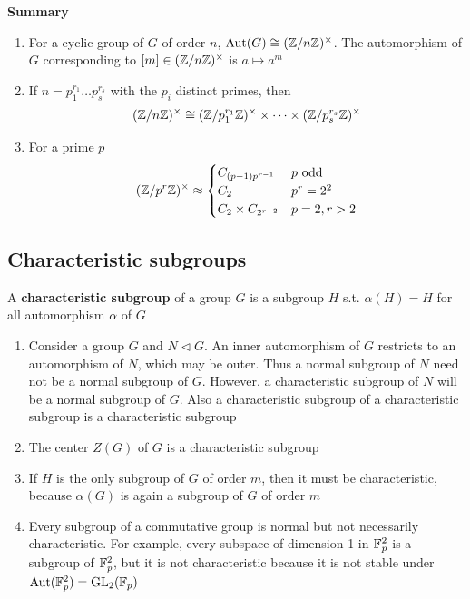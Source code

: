 \documentclass[11pt]{article}
\begin{document}
\textbf{Summary}
\begin{enumerate}
\item For a cyclic group of \(G\) of order \(n\), \(\operatorname{\text{Aut}}(G)\cong(\mathbb{Z}/n\mathbb{Z})^\times\). The automorphism of \(G\)
corresponding to \([m]\in(\mathbb{Z}/n\mathbb{Z})^{\times}\) is \(a\mapsto a^m\)
\item If \(n=p_1^{r_1}\dots p_s^{r_s}\) with the \(p_i\) distinct primes, then
\begin{equation*}
(\mathbb{Z}/n\mathbb{Z})^\times\cong(\mathbb{Z}/p_1^{r_1}\mathbb{Z})^\times \times\dots\times(\mathbb{Z}/p_s^{r_s}\mathbb{Z})^\times
\end{equation*}
\item For a prime \(p\)
\begin{equation*}
(\mathbb{Z}/p^r\mathbb{Z})^\times\approx
\begin{cases}
C_{(p-1)p^{r-1}}&p\text{ odd}\\
C_2&p^r=2^2\\
C_2\times C_{2^{r-2}}&p=2,r>2
\end{cases}
\end{equation*}
\end{enumerate}
\subsection{Characteristic subgroups}
\label{sec:org95d0d3a}
\begin{definition}[]
A \textbf{characteristic subgroup} of a group \(G\) is a subgroup \(H\) s.t. \(\alpha(H)=H\) for all
automorphism \(\alpha\) of \(G\)
\end{definition}

\begin{remark}
\begin{enumerate}
\item Consider a group \(G\) and \(N\lhd G\). An inner automorphism of \(G\) restricts to an
automorphism of \(N\), which may be outer. Thus a normal subgroup of \(N\) need not be a
normal subgroup of \(G\). However, a characteristic subgroup of \(N\) will be a normal
subgroup of \(G\). Also a characteristic subgroup of a characteristic subgroup is a
characteristic subgroup
\item The center \(Z(G)\) of \(G\) is a characteristic subgroup
\item If \(H\) is the only subgroup of \(G\) of order \(m\), then it must be characteristic,
because \(\alpha(G)\) is again a subgroup of \(G\) of order \(m\)
\item Every subgroup of a commutative group is normal but not necessarily characteristic. For
example, every subspace of dimension 1 in \(\mathbb{F}_p^2\) is a subgroup of \(\mathbb{F}_p^2\), but it is not
characteristic because it is not stable under \(\operatorname{\text{Aut}}(\mathbb{F}_p^2)=\operatorname{GL}_2(\mathbb{F}_p)\)
\end{enumerate}
\end{remark}
\end{document}
